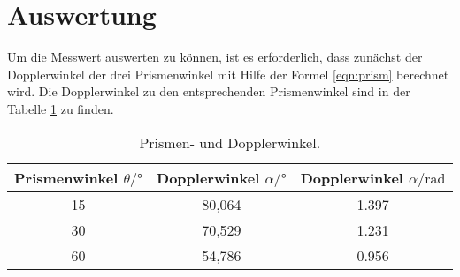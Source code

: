 \section{Auswertung}
\label{sec:Auswertung}
Um die Messwert auswerten zu können, ist es erforderlich,
dass zunächst der Dopplerwinkel \alpha der drei Prismenwinkel \theta
mit Hilfe der Formel \eqref{eqn:prism} berechnet wird.
Die Dopplerwinkel zu den entsprechenden Prismenwinkel
sind in der Tabelle \ref{tab:winkel} zu finden.
\begin{table}
  \centering
  \caption{Prismen- und Dopplerwinkel.}
  \label{tab:winkel}
  \begin{tabular}{c c c}
    \toprule
    Prismenwinkel $\theta/\si{\degree}$& Dopplerwinkel $\alpha / \si{\degree}$& Dopplerwinkel $\alpha /\si{\radian}$\\
    \midrule
15 & 80,064 & 1.397\\
30 & 70,529 & 1.231\\
60 & 54,786 & 0.956\\
    \bottomrule
  \end{tabular}
\end{table}

